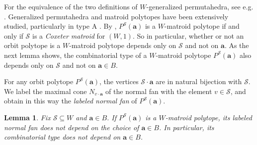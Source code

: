 \documentclass{amsart}
\newtheorem{lem}[thm]{Lemma}
\theoremstyle{definition}
\def\ba{\mathbf{a}}
\def\cS{\mathcal{S}}
\begin{document}
For the equivalence of the two definitions of $W$-generalized permutahedra, see e.g. \cite[Proposition 2.6]{ACEP}. Generalized permutahedra and matroid polytopes have been extensively studied, particularly in type A \cite{PRW08,Post09}.
By \cite[Theorem 6.4.1]{BGW}, $P^\cS(\ba)$ is a $W$-matroid polytope if and only if $\cS$ is a \emph{Coxeter matroid} for $(W,1)$. So in particular, whether or not an orbit polytope is a $W$-matroid polytope depends only on $\cS$ and not on $\ba$.
As the next lemma shows, the combinatorial type of a $W$-matroid polytope $P^\cS(\ba)$ also depends only on $\cS$ and not on $\ba \in B$.

For any orbit polytope $P^\cS(\ba)$, the vertices $\cS \cdot \ba$ are in natural bijection with $\cS$. We label the maximal cone $N_{v \cdot \ba}$ of the normal fan with the element $v \in \cS$, and obtain in this way the \emph{labeled normal fan} of $P^\cS(\ba)$.

\begin{lem}\label{lem:consistent-type-gen}
    Fix $\cS\subseteq W$ and $\ba \in B$. If $P^\cS(\ba)$ is a $W$-matroid polytope, its labeled normal fan does not depend on the choice of $\ba\in B$. In particular, its combinatorial type does not depend on $\ba \in B$.
\end{lem}
\end{document}
